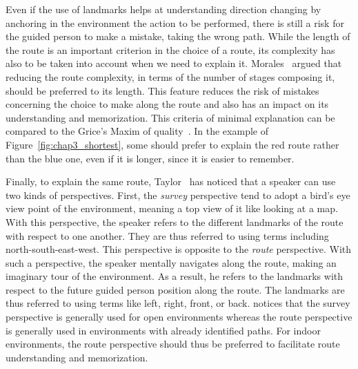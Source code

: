 Even if the use of landmarks helps at understanding direction changing by anchoring in the environment the action to be performed, there is still a risk for the guided person to make a mistake, taking the wrong path. While the length of the route is an important criterion in the choice of a route, its complexity has also to be taken into account when we need to explain it. Morales~\cite{morales_2015_building} argued that reducing the route complexity, in terms of the number of stages composing it, should be preferred to its length. This feature reduces the risk of mistakes concerning the choice to make along the route and also has an impact on its understanding and memorization. This criteria of minimal explanation can be compared to the Grice's Maxim of quality~\cite{grice_1975_logic}. In the example of Figure~\ref{fig:chap3_shortest}, some should prefer to explain the red route rather than the blue one, even if it is longer, since it is easier to remember.

Finally, to explain the same route, Taylor~\cite{taylor_1992_spatial} has noticed that a speaker can use two kinds of perspectives. First, the \textit{survey} perspective tend to adopt a bird's eye view point of the environment, meaning a top view of it like looking at a map. With this perspective, the speaker refers to the different landmarks of the route with respect to one another. They are thus referred to using terms including north-south-east-west. This perspective is opposite to the \textit{route} perspective. With such a perspective, the speaker mentally navigates along the route, making an imaginary tour of the environment. As a result, he refers to the landmarks with respect to the future guided person position along the route. The landmarks are thus referred to using terms like left, right, front, or back. \cite{taylor_1996_perspective} notices that the survey perspective is generally used for open environments whereas the route perspective is generally used in environments with already identified paths. For indoor environments, the route perspective should thus be preferred to facilitate route understanding and memorization.



